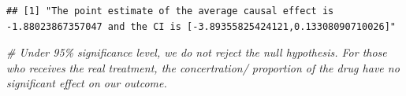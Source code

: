 \documentclass[]{article}
\newenvironment{Shaded}{\begin{snugshade}}{\end{snugshade}}
\newcommand{\CommentTok}[1]{\textcolor[rgb]{0.56,0.35,0.01}{\textit{#1}}}
\begin{document}
\begin{verbatim}
## [1] "The point estimate of the average causal effect is -1.88023867357047 and the CI is [-3.89355825424121,0.13308090710026]"
\end{verbatim}

\begin{Shaded}
\begin{Highlighting}[]
\CommentTok{# Under 95\% significance level, we do not reject the null hypothesis. For those who receives the real treatment, the concertration/ proportion of the drug have no significant effect on our outcome.}
\end{Highlighting}
\end{Shaded}
\end{document}
